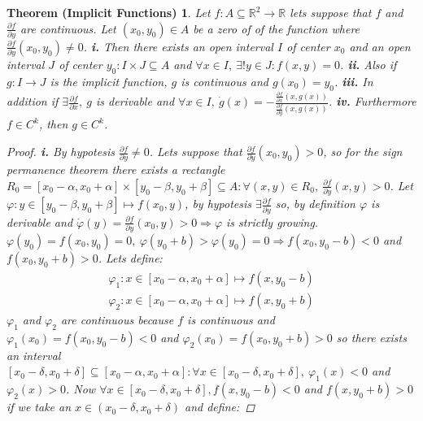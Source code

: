 \documentclass{article}
\newtheorem*{implicitfunctions}{Theorem (Implicit Functions)}
\begin{document}
            \begin{implicitfunctions}
                Let $f:A \subseteq \mathbb{R}^2 \rightarrow \mathbb{R}$ lets suppose that $f$ and $\frac{\partial f}{\partial y}$ are continuous. Let $(x_0,y_0) \in A$ be a zero of of the function where $\frac{\partial f}{\partial y} (x_0,y_0) \neq 0$. \textbf{i.} Then there exists an open interval $I$ of center $x_0$ and an open interval $J$ of center $y_0 : I \times J \subseteq A$ and $\forall x \in I, \ \exists! y \in J : f(x,y) = 0$. \textbf{ii.} Also if $g: I \rightarrow J$ is the implicit function, $g$ is continuous and $g(x_0) = y_0$. \textbf{iii.} In addition if $\exists \frac{\partial f}{\partial x}, \ g$ is derivable and $\forall x \in I, \ \dot{g}(x) = -\frac{\frac{\partial f}{\partial x}(x,g(x))}{\frac{\partial f}{\partial y}(x,g(x))}$. \textbf{iv.} Furthermore $f \in C^k$, then $g\in C^k$.  
                \begin{proof}
                    \textbf{i.} By hypotesis $\frac{\partial f}{\partial y} \neq 0$. Lets suppose that $\frac{\partial f}{\partial y}(x_0,y_0) > 0$, so for the sign permanence theorem there exists a rectangle $R_0 = [x_0 - \alpha , x_0 + \alpha] \times [y_0 - \beta , y_0 + \beta] \subseteq A : \forall (x,y) \in R_0, \ \frac{\partial f}{\partial y}(x,y) > 0$. Let $\varphi: y\in [y_0 - \beta , y_0 + \beta] \longmapsto f(x_0,y)$, by hypotesis $\exists \frac{\partial f}{\partial y}$ so, by definition $\varphi$ is derivable and $\dot{\varphi}(y)= \frac{\partial f}{\partial y}(x_0,y) > 0 \Rightarrow \varphi$ is strictly growing. $\varphi (y_0) = f(x_0,y_0) = 0, \ \varphi (y_0 + b) > \varphi(y_0) = 0 \Rightarrow f(x_0,y_0 - b) < 0$ and $f(x_0,y_0+b) > 0$. Lets define:
                    \begin{gather*}
                        \varphi_1: x\in [x_0- \alpha,x_0 + \alpha] \longmapsto f(x,y_0 - b) \\
                        \varphi_2: x\in [x_0- \alpha,x_0 + \alpha] \longmapsto f(x,y_0 + b)
                    \end{gather*}
                    $\varphi_1$ and $\varphi_2$ are continuous because $f$ is continuous and $\varphi_1 (x_0) = f(x_0,y_0 -b) < 0$ and $\varphi_2(x_0) = f(x_0,y_0 + b) > 0$ so there exists an interval $[x_0 - \delta, x_0 + \delta] \subseteq [x_0 - \alpha, x_0 + \alpha] : \forall x \in [x_0 - \delta, x_0 +\delta], \ \varphi_1(x) < 0$ and $\varphi_2(x) > 0$. Now $\forall x \in [x_0 - \delta, x_0 +\delta], f(x,y_0 - b) < 0 $ and $f(x,y_0 + b ) > 0$ if we take an $x \in (x_0 - \delta, x_0 +\delta)$ and define: 

\end{proof}
\end{implicitfunctions}
\end{document}
